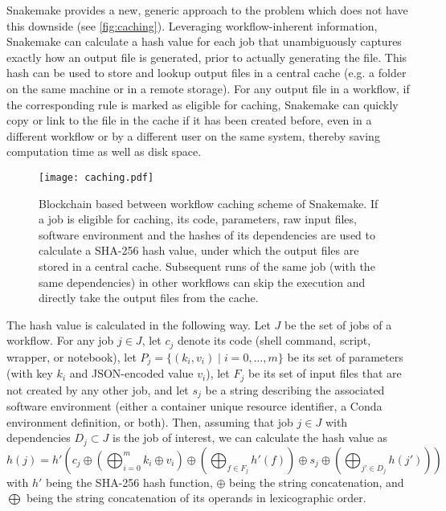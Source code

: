 \documentclass[parskip=half]{scrartcl}
\begin{document}
Snakemake provides a new, generic approach to the problem which does not have this downside (see \autoref{fig:caching}).
Leveraging workflow-inherent information, Snakemake can calculate a hash value for each job that unambiguously captures exactly how an output file is generated, prior to actually generating the file.
This hash can be used to store and lookup output files in a central cache (e.g. a folder on the same machine or in a remote storage).
For any output file in a workflow, if the corresponding rule is marked as eligible for caching, Snakemake can quickly copy or link to the file in the cache if it has been created before, even in a different workflow or by a different user on the same system, thereby saving computation time as well as disk space.

\begin{figure}
	\centering
	\texttt{[image: caching.pdf]}
	\caption{
		Blockchain based between workflow caching scheme of Snakemake.
		If a job is eligible for caching, its code, parameters, raw input files, software environment and the hashes of its dependencies are used to calculate a SHA-256 hash value, under which the output files are stored in a central cache.
		Subsequent runs of the same job (with the same dependencies) in other workflows can skip the execution and directly take the output files from the cache.
	}
	\label{fig:caching}
\end{figure}

The hash value is calculated in the following way.
Let $J$ be the set of jobs of a workflow.
For any job $j \in J$, let $c_j$ denote its code (shell command, script, wrapper, or notebook), let $P_j = \{(k_i, v_i) \mid i=0,\dots,m\}$ be its set of parameters (with key $k_i$ and JSON-encoded value $v_i$), let $F_j$ be its set of input files that are not created by any other job, and let $s_j$ be a string describing the associated software environment (either a container unique resource identifier, a Conda environment definition, or both).
Then, assuming that job $j \in J$ with dependencies $D_j \subset J$ is the job of interest, we can calculate the hash value as $$ h(j) = h'\left( c_j \oplus \left(\bigoplus_{i=0}^m k_i \oplus v_i \right) \oplus \left( \bigoplus_{f \in F_j} h'(f) \right) \oplus s_j \oplus \left( \bigoplus_{j' \in D_j} h(j') \right) \right) $$ with $h'$ being the SHA-256 \parencite{Handschuh} hash function, $\oplus$ being the string concatenation, and $\bigoplus$ being the string concatenation of its operands in lexicographic order.
\end{document}

